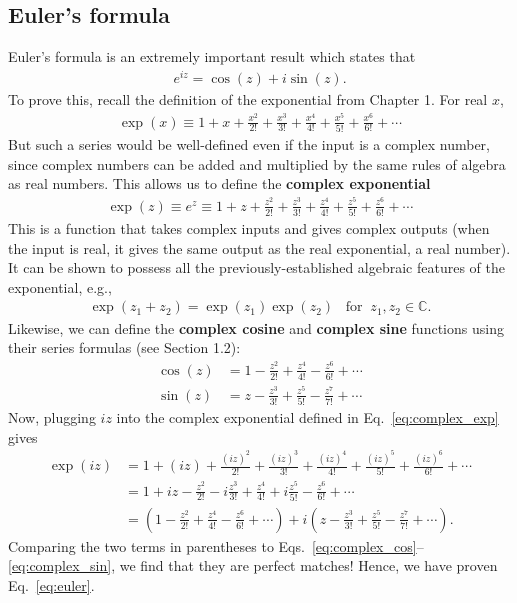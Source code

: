 \documentclass[10pt,a4paper]{article}
\begin{document}
\subsection{Euler's formula}
\label{eulers-formula}

Euler's formula is an extremely important result which states that
\begin{align}
  e^{iz} = \cos(z) + i \sin(z).
  \label{eq:euler}
\end{align}
To prove this, recall the definition of the exponential from Chapter
1.  For real $x$,
\begin{align}
  \exp(x) \equiv 1 + x + \frac{x^2}{2!} + \frac{x^3}{3!} + \frac{x^4}{4!} + \frac{x^5}{5!} + \frac{x^6}{6!} + \cdots
\end{align}
But such a series would be well-defined even if the input is a complex
number, since complex numbers can be added and multiplied by the same
rules of algebra as real numbers. This allows us to define the
\textbf{complex exponential}
\begin{align}
  \exp(z) \equiv e^z \equiv 1 + z + \frac{z^2}{2!} + \frac{z^3}{3!} + \frac{z^4}{4!} + \frac{z^5}{5!} + \frac{z^6}{6!} + \cdots
  \label{eq:complex_exp}
\end{align}
This is a function that takes complex inputs and gives complex outputs
(when the input is real, it gives the same output as the real
exponential, a real number). It can be shown to possess all the
previously-established algebraic features of the exponential, e.g.,
\begin{align}
  \exp(z_1 + z_2) = \exp(z_1) \exp(z_2) \;\;\;\mathrm{for}\;\; z_1, z_2 \in \mathbb{C}.
\end{align}
Likewise, we can define the \textbf{complex cosine} and
\textbf{complex sine} functions using their series formulas (see
Section 1.2):
\begin{align}
  \cos(z) &= 1 - \frac{z^2}{2!} + \frac{z^4}{4!} - \frac{z^6}{6!} + \cdots
  \label{eq:complex_cos} \\
  \sin(z) &= z - \frac{z^3}{3!} + \frac{z^5}{5!} - \frac{z^7}{7!} + \cdots
  \label{eq:complex_sin}
\end{align}
Now, plugging $iz$ into the complex exponential defined in
Eq.~\eqref{eq:complex_exp} gives
\begin{align}
  \exp(iz) &= 1 + (iz) + \frac{(iz)^2}{2!} + \frac{(iz)^3}{3!} + \frac{(iz)^4}{4!} + \frac{(iz)^5}{5!} + \frac{(iz)^6}{6!} + \cdots \\
  &= 1 + iz - \frac{z^2}{2!} - i \frac{z^3}{3!} + \frac{z^4}{4!} + i \frac{z^5}{5!} - \frac{z^6}{6!} + \cdots \\
  & = \left(1 - \frac{z^2}{2!} + \frac{z^4}{4!} - \frac{z^6}{6!} + \cdots\right) + i\left(z  - \frac{z^3}{3!}  + \frac{z^5}{5!}  - \frac{z^7}{7!} + \cdots\right).
\end{align}
Comparing the two terms in parentheses to
Eqs.~\eqref{eq:complex_cos}--\eqref{eq:complex_sin}, we find that they
are perfect matches! Hence, we have proven Eq.~\eqref{eq:euler}.
\end{document}
